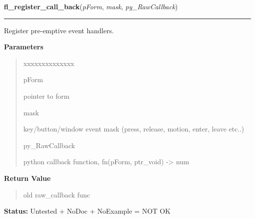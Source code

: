 \hspace{.8\funcindent}\begin{boxedminipage}{\funcwidth}

    \raggedright \textbf{fl\_register\_call\_back}(\textit{pForm}, \textit{mask}, \textit{py\_RawCallback})

    \vspace{-1.5ex}

    \rule{\textwidth}{0.5\fboxrule}
\setlength{\parskip}{2ex}
    Register pre-emptive event handlers.

\setlength{\parskip}{1ex}
      \textbf{Parameters}
      \vspace{-1ex}

      \begin{quote}
        \begin{Ventry}{xxxxxxxxxxxxxx}

          \item[pForm]

          pointer to form

          \item[mask]

          key/button/window event mask (press, release, motion, enter, 
          leave etc..)

          \item[py\_RawCallback]

          python callback function, fn(pForm, ptr\_void) -{\textgreater} 
          num

        \end{Ventry}

      \end{quote}

      \textbf{Return Value}
    \vspace{-1ex}

      \begin{quote}
      old raw\_callback func

      \end{quote}

\textbf{Status:} Untested + NoDoc + NoExample = NOT OK



    \end{boxedminipage}

    \label{xformslib:library:fl_bgn_group}

    \vspace{0.5ex}

